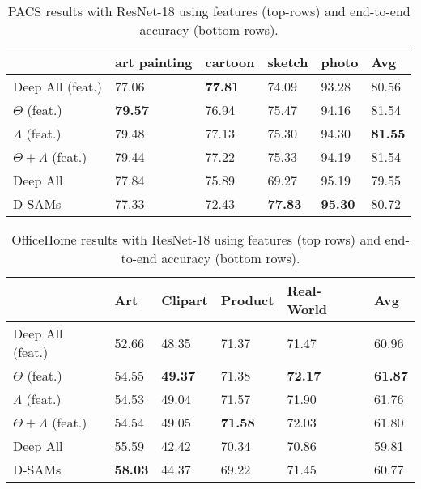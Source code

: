 \begin{table}
\centering
\caption{PACS results with ResNet-18 using features (top-rows) and end-to-end accuracy (bottom rows).}
\label{table:resnetpacs}
\begin{tabular}{p{2.5cm}p{1.9cm}p{1.9cm}p{1.9cm}p{1.9cm}|p{1.9cm}}
\hline
\textbf{}   & art painting & cartoon & sketch & photo & Avg   \\
\hline
Deep All (feat.) & 77.06        & \textbf{77.81}   & 74.09  & 93.28 & 80.56 \\
$\Theta$ (feat.)    & \textbf{79.57}        & 76.94   & 75.47  & 94.16 & 81.54 \\
$\Lambda$ (feat.)    & 79.48        & 77.13   & 75.30  & 94.30 & \textbf{81.55} \\
$\Theta + \Lambda$ (feat.) & 79.44 & 77.22 & 75.33 & 94.19 & 81.54
\\
\hline
Deep All    & 77.84        & 75.89   & 69.27  & 95.19  & 79.55 \\
D-SAMs       & 77.33        & 72.43   & \textbf{77.83}  &  \textbf{95.30} & 80.72
\end{tabular}
\end{table}

\begin{table}
\caption{OfficeHome results with ResNet-18 using features (top rows) and end-to-end accuracy (bottom rows).}
\label{table:resnetoh}
\begin{tabular}
{p{2.5cm}p{1.9cm}p{1.9cm}p{1.9cm}p{1.9cm}|p{1.9cm}}
\hline
\textbf{}      & Art   & Clipart & Product & Real-World & Avg   \\
\hline
Deep All (feat.) & 52.66 & 48.35   & 71.37   & 71.47      & 60.96 \\
$\Theta$ (feat.) & 54.55 & \textbf{49.37}   & 71.38   & \textbf{72.17}      & \textbf{61.87} \\
$\Lambda$ (feat.)     & 54.53    & 49.04      & 71.57      & 71.90         & 61.76    \\
$\Theta + \Lambda$ (feat.) & 54.54 & 49.05 & \textbf{71.58} & 72.03 & 61.80 \\
\hline
Deep All       & 55.59 & 42.42   & 70.34   & 70.86      & 59.81 \\
D-SAMs          & \textbf{58.03} & 44.37   & 69.22   & 71.45      & 60.77
\end{tabular}
\end{table}